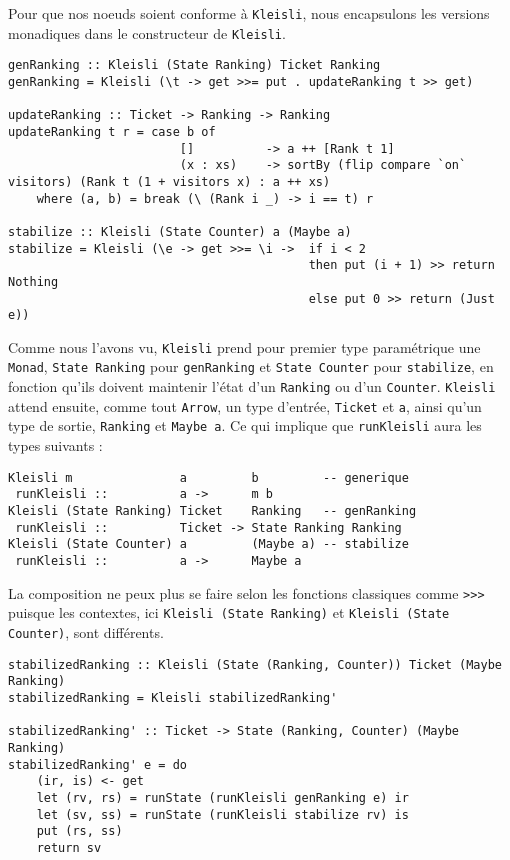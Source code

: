\documentclass{llncs}
\begin{document}
Pour que nos noeuds soient conforme à \lstinline{Kleisli}, nous encapsulons les
versions monadiques dans le constructeur de \lstinline{Kleisli}.
\begin{lstlisting}
genRanking :: Kleisli (State Ranking) Ticket Ranking
genRanking = Kleisli (\t -> get >>= put . updateRanking t >> get)

updateRanking :: Ticket -> Ranking -> Ranking
updateRanking t r = case b of
                        []          -> a ++ [Rank t 1]
                        (x : xs)    -> sortBy (flip compare `on` visitors) (Rank t (1 + visitors x) : a ++ xs)
    where (a, b) = break (\ (Rank i _) -> i == t) r

stabilize :: Kleisli (State Counter) a (Maybe a)
stabilize = Kleisli (\e -> get >>= \i ->  if i < 2
                                          then put (i + 1) >> return Nothing
                                          else put 0 >> return (Just e))
\end{lstlisting}
Comme nous l'avons vu, \lstinline{Kleisli} prend pour premier type paramétrique
une \lstinline{Monad}, \lstinline{State Ranking} pour \lstinline{genRanking} et
\lstinline{State Counter} pour \lstinline{stabilize}, en fonction qu'ils doivent
maintenir l'état d'un \lstinline{Ranking} ou d'un \lstinline{Counter}.
\lstinline{Kleisli} attend ensuite, comme tout \lstinline{Arrow}, un type d'entrée,
\lstinline{Ticket} et \lstinline{a}, ainsi qu'un type de sortie, \lstinline{Ranking}
et \lstinline{Maybe a}.
Ce qui implique que \lstinline{runKleisli} aura les types suivants :
\begin{lstlisting}
Kleisli m               a         b         -- generique
 runKleisli ::          a ->      m b
Kleisli (State Ranking) Ticket    Ranking   -- genRanking
 runKleisli ::          Ticket -> State Ranking Ranking
Kleisli (State Counter) a         (Maybe a) -- stabilize
 runKleisli ::          a ->      Maybe a
\end{lstlisting}

La composition ne peux plus se faire selon les fonctions classiques comme \lstinline{>>>}
puisque les contextes, ici \lstinline{Kleisli (State Ranking)} et \lstinline{Kleisli (State Counter)},
sont différents.

\begin{lstlisting}
stabilizedRanking :: Kleisli (State (Ranking, Counter)) Ticket (Maybe Ranking)
stabilizedRanking = Kleisli stabilizedRanking'

stabilizedRanking' :: Ticket -> State (Ranking, Counter) (Maybe Ranking)
stabilizedRanking' e = do
    (ir, is) <- get
    let (rv, rs) = runState (runKleisli genRanking e) ir
    let (sv, ss) = runState (runKleisli stabilize rv) is
    put (rs, ss)
    return sv
\end{lstlisting}
\end{document}

